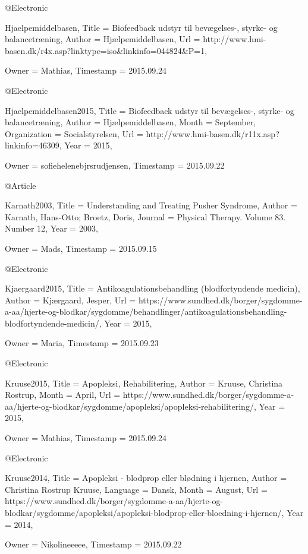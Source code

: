 @Electronic{Hjaelpemiddelbasen,
  Title                    = {Biofeedback udstyr til bevægelses-, styrke- og balancetræning},
  Author                   = {Hjælpemiddelbasen},
  Url                      = {http://www.hmi-basen.dk/r4x.asp?linktype=iso&linkinfo=044824&P=1},

  Owner                    = {Mathias},
  Timestamp                = {2015.09.24}
}

@Electronic{Hjaelpemiddelbasen2015,
  Title                    = {Biofeedback udstyr til bevægelses-, styrke- og balancetræning},
  Author                   = {Hjælpemiddelbasen},
  Month                    = {September},
  Organization             = {Socialstyrelsen},
  Url                      = {http://www.hmi-basen.dk/r11x.asp?linkinfo=46309},
  Year                     = {2015},

  Owner                    = {sofiehelenebjrsrudjensen},
  Timestamp                = {2015.09.22}
}

@Article{Karnath2003,
  Title                    = {Understanding and Treating Pusher Syndrome},
  Author                   = {Karnath, Hans-Otto; Broetz, Doris},
  Journal                  = {Physical Therapy. Volume 83. Number 12},
  Year                     = {2003},

  Owner                    = {Mads},
  Timestamp                = {2015.09.15}
}

@Electronic{Kjaergaard2015,
  Title                    = {Antikoagulationsbehandling (blodfortyndende medicin)},
  Author                   = {Kjærgaard, Jesper},
  Url                      = {https://www.sundhed.dk/borger/sygdomme-a-aa/hjerte-og-blodkar/sygdomme/behandlinger/antikoagulationsbehandling-blodfortyndende-medicin/},
  Year                     = {2015},

  Owner                    = {Maria},
  Timestamp                = {2015.09.23}
}

@Electronic{Kruuse2015,
  Title                    = {Apopleksi, Rehabilitering},
  Author                   = {Kruuse, Christina Rostrup},
  Month                    = {April},
  Url                      = {https://www.sundhed.dk/borger/sygdomme-a-aa/hjerte-og-blodkar/sygdomme/apopleksi/apopleksi-rehabilitering/},
  Year                     = {2015},

  Owner                    = {Mathias},
  Timestamp                = {2015.09.24}
}

@Electronic{Kruuse2014,
  Title                    = {Apopleksi - blodprop eller blødning i hjernen},
  Author                   = {Christina Rostrup Kruuse},
  Language                 = {Dansk},
  Month                    = {August},
  Url                      = {https://www.sundhed.dk/borger/sygdomme-a-aa/hjerte-og-blodkar/sygdomme/apopleksi/apopleksi-blodprop-eller-bloedning-i-hjernen/},
  Year                     = {2014},

  Owner                    = {Nikolineeeee},
  Timestamp                = {2015.09.22}
}

